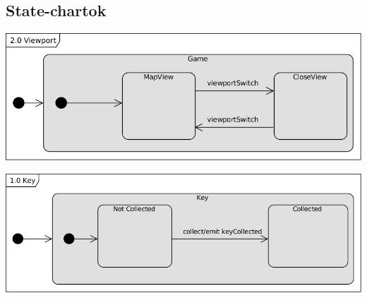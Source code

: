 	\subsection{State-chartok}
\begin{center}\includegraphics[scale=1]{resources/20Viewport.png}\end{center}
\begin{center}\includegraphics[scale=1]{resources/10Key.png}\end{center}	

	
